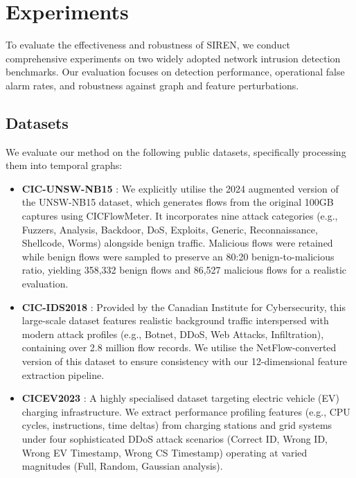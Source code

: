 \section{Experiments}\label{sec:experiments}

To evaluate the effectiveness and robustness of SIREN, we conduct comprehensive experiments on two widely adopted network intrusion detection benchmarks. Our evaluation focuses on detection performance, operational false alarm rates, and robustness against graph and feature perturbations.

\subsection{Datasets}

We evaluate our method on the following public datasets, specifically processing them into temporal graphs:

\begin{itemize}
    \item \textbf{CIC-UNSW-NB15} \cite{Mohammadian2024cicunsw}: We explicitly utilise the 2024 augmented version of the UNSW-NB15 dataset, which generates flows from the original 100GB captures using CICFlowMeter. It incorporates nine attack categories (e.g., Fuzzers, Analysis, Backdoor, DoS, Exploits, Generic, Reconnaissance, Shellcode, Worms) alongside benign traffic. Malicious flows were retained while benign flows were sampled to preserve an 80:20 benign-to-malicious ratio, yielding 358,332 benign flows and 86,527 malicious flows for a realistic evaluation.
    \item \textbf{CIC-IDS2018} \cite{Sharafaldin2018cicids}: Provided by the Canadian Institute for Cybersecurity, this large-scale dataset features realistic background traffic interspersed with modern attack profiles (e.g., Botnet, DDoS, Web Attacks, Infiltration), containing over 2.8 million flow records. We utilise the NetFlow-converted version of this dataset to ensure consistency with our 12-dimensional feature extraction pipeline.
    \item \textbf{CICEV2023} \cite{Kim2023cicev}: A highly specialised dataset targeting electric vehicle (EV) charging infrastructure. We extract performance profiling features (e.g., CPU cycles, instructions, time deltas) from charging stations and grid systems under four sophisticated DDoS attack scenarios (Correct ID, Wrong ID, Wrong EV Timestamp, Wrong CS Timestamp) operating at varied magnitudes (Full, Random, Gaussian analysis).
\end{itemize}


